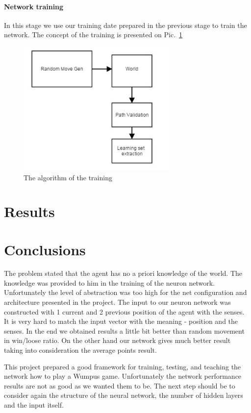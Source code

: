 \documentclass[a4paper]{article}
\begin{document}
	\paragraph{Network training}
	In this stage we use our training date prepared in the previous stage to train the network.
	The concept of the training is presented on Pic.~\ref{pic:trainDataAuto}
	 \begin{figure}[!h]
		\centering	
		\includegraphics[width=0.7\textwidth]{pic/trainDataAuto.jpg}
		\caption{The algorithm of the training}
		\label{pic:trainDataAuto}
	\end{figure}
	
	 

	\section{Results}
	
	\section{Conclusions}
	The problem stated that the agent has no a priori knowledge of the world. The knowledge was provided to him in the training of the neuron network. Unfortunately the level of abstraction was too high for the net configuration and architecture presented in the project. The input to our neuron network was constructed with 1 current and 2 previous position of the agent with the senses. It is very hard to match the input vector with the meaning - position and the senses. In the end we obtained results a little bit better than random movement in win/loose ratio. On the other hand our network gives much better result taking into consideration the average points result. 
	
This project prepared a good framework for training, testing, and teaching the network how to play a Wumpus game. Unfortunately the network performance results are not as good as we wanted them to be. The next step should be to consider again the structure of the neural network, the number of hidden layers and the input itself.	
\end{document}
